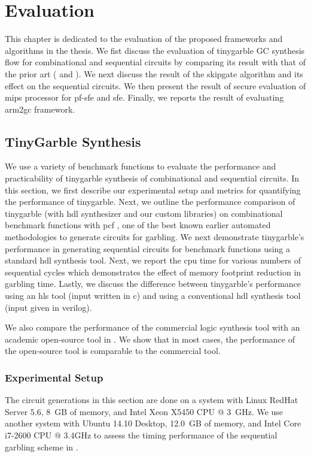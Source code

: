 \chapter{Evaluation}\label{chap:eval}
This chapter is dedicated to the evaluation of the proposed frameworks and algorithms in the thesis.
We fist discuss the evaluation of \gls{tinygarble} GC synthesis flow for combinational and sequential circuits by comparing its result with that of the prior art ( and ).
We next discuss the result of the \gls{skipgate} algorithm and its effect on the sequential circuits.
We then present the result of secure evaluation of \gls{mips} processor for \acrshort{pf-sfe} and \acrshort{sfe}.
Finally, we reports the result of evaluating \gls{arm2gc} framework.

\section{TinyGarble Synthesis}\label{sec:eval-tinygarble}
We use a variety of benchmark functions to evaluate the performance and practicability of \gls{tinygarble} synthesis of combinational and sequential circuits.
In this section, we first describe our experimental setup and metrics for quantifying the performance of \gls{tinygarble}.
Next, we outline the performance comparison of \gls{tinygarble} (with \acrshort{hdl} synthesizer and our custom libraries) on combinational benchmark functions with \gls{pcf} \cite{kreuter2013pcf}, one of the best known earlier automated methodologies to generate circuits for garbling.
We next demonstrate \gls{tinygarble}'s performance in generating sequential circuits for benchmark functions using a standard \acrshort{hdl} synthesis tool.
Next, we report the \acrshort{cpu} time for various numbers of sequential cycles which demonstrates the effect of memory footprint reduction in garbling time.
Lastly, we discuss the difference between \gls{tinygarble}'s performance using an \acrshort{hls} tool (input written in \gls{c}) and using a conventional \acrshort{hdl} synthesis tool (input given in \gls{verilog}).

We also compare the performance of the commercial logic synthesis tool with an academic open-source tool in .
We show that in most cases, the performance of the open-source tool is comparable to the commercial tool.

\subsection{Experimental Setup}\label{ssec:eval-tinygarble-setup}
The circuit generations in this section are done on a system with Linux RedHat Server 5.6, 8~GB of memory, and Intel Xeon X5450 CPU @ 3~GHz.
We use another system with Ubuntu 14.10 Desktop, 12.0~GB of memory, and Intel Core i7-2600 CPU @ 3.4GHz to assess the timing performance of the sequential garbling scheme in .

